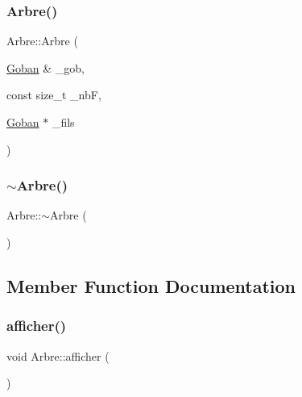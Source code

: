 \subsubsection{\texorpdfstring{Arbre()}{Arbre()}\hspace{0.1cm}{\footnotesize\ttfamily [5/5]}}
{\footnotesize\ttfamily Arbre\+::\+Arbre (\begin{DoxyParamCaption}\item[{\hyperlink{class_goban}{Goban} \&}]{\+\_\+gob,  }\item[{const size\+\_\+t}]{\+\_\+nbF,  }\item[{\hyperlink{class_goban}{Goban} $\ast$}]{\+\_\+fils }\end{DoxyParamCaption})}

\mbox{\label{class_arbre_ad5f22ec66953891aef2722438fb7c088}} 
\subsubsection{\texorpdfstring{$\sim$\+Arbre()}{~Arbre()}}
{\footnotesize\ttfamily Arbre\+::$\sim$\+Arbre (\begin{DoxyParamCaption}{ }\end{DoxyParamCaption})}



\subsection{Member Function Documentation}
\mbox{\label{class_arbre_a970de955ffdbbd5894e0fa0c40c4e69e}} 
\subsubsection{\texorpdfstring{afficher()}{afficher()}}
{\footnotesize\ttfamily void Arbre\+::afficher (\begin{DoxyParamCaption}{ }\end{DoxyParamCaption})}

